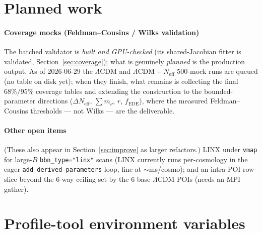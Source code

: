 \documentclass[11pt]{article}
\newcommand{\code}[1]{\texttt{\small #1}}
\newcommand{\Neff}{N_{\mathrm{eff}}}
\begin{document}
\section{Planned work}
\label{sec:future}

\paragraph{Coverage mocks (Feldman--Cousins / Wilks validation)}
The batched validator is \emph{built and GPU-checked} (its shared-Jacobian
fitter is validated, Section~\ref{sec:coverage}); what is genuinely
\emph{planned} is the production output. As of 2026-06-29 the $\Lambda$CDM
and $\Lambda\mathrm{CDM}+\Neff$ $500$-mock runs are queued (no table on disk
yet); when they finish, what remains is collecting the final $68\%/95\%$
coverage tables and extending the construction to the bounded-parameter
directions ($\Delta\Neff$, $\sum m_\nu$, $r$, $f_{\mathrm{EDE}}$), where the
measured Feldman--Cousins thresholds --- not Wilks --- are the deliverable.

\paragraph{Other open items}
(These also appear in Section~\ref{sec:improve} as larger refactors.) LINX
under \code{vmap} for large-$B$ \code{bbn\_type="linx"} scans (LINX
currently runs per-cosmology in the eager \code{add\_derived\_parameters}
loop, fine at $\sim$ms/cosmo); and an intra-POI row-slice beyond the $6$-way
ceiling set by the $6$ base-$\Lambda$CDM POIs (needs an MPI gather).

\appendix
\section{Profile-tool environment variables}
\label{app:profenv}
\end{document}

